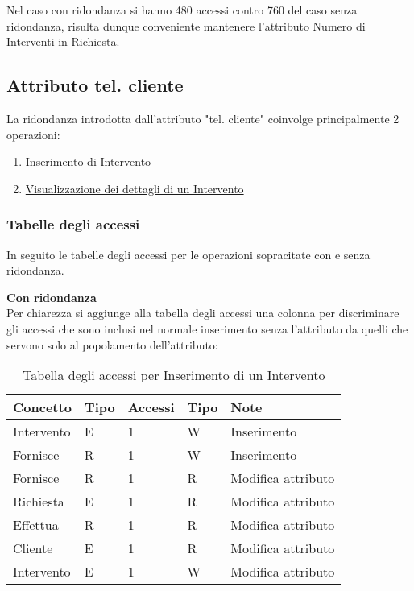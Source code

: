 \documentclass{article}
\begin{document}
Nel caso con ridondanza si hanno 480 accessi contro 760 del caso senza ridondanza, risulta dunque conveniente mantenere l'attributo Numero di Interventi in Richiesta.

\subsection{Attributo tel. cliente}

La ridondanza introdotta dall'attributo "tel. cliente" coinvolge principalmente 2 operazioni: 

\begin{enumerate}
    \item \underline{Inserimento di Intervento}
    \item \underline{Visualizzazione dei dettagli di un Intervento} 
\end{enumerate}

\subsubsection{Tabelle degli accessi}

In seguito le tabelle degli accessi per le operazioni sopracitate con e senza ridondanza.

\textbf{Con ridondanza}\\
Per chiarezza si aggiunge alla tabella degli accessi una colonna per discriminare gli accessi che sono inclusi nel normale inserimento senza l'attributo da quelli che servono solo al popolamento dell'attributo:
    
\begin{table}[h]
    \centering
        \begin{adjustbox}{width=0.8\textwidth}
            \begin{tabular}{|m{2cm}|m{2cm}|m{2cm}|m{2cm}|m{3cm}|}
                \hline  
                \textbf{Concetto} & \textbf{Tipo} & \textbf{Accessi} & \textbf{Tipo} & \textbf{Note}\\ 
                \hline
                Intervento & E & 1 & W & Inserimento \\
                \hline
                Fornisce & R & 1 & W & Inserimento \\
                \hline
                Fornisce & R & 1 & R & Modifica attributo \\
                \hline
                Richiesta & E & 1 & R & Modifica attributo \\
                \hline
                Effettua & R & 1 & R & Modifica attributo \\
                \hline
                Cliente & E & 1 & R & Modifica attributo \\
                \hline            
                Intervento & E & 1 & W & Modifica attributo \\
                \hline
            \end{tabular}
        \end{adjustbox}
    \caption{Tabella degli accessi per Inserimento di un Intervento}
    \label{tab:accesstable9}
\end{table}
\end{document}

